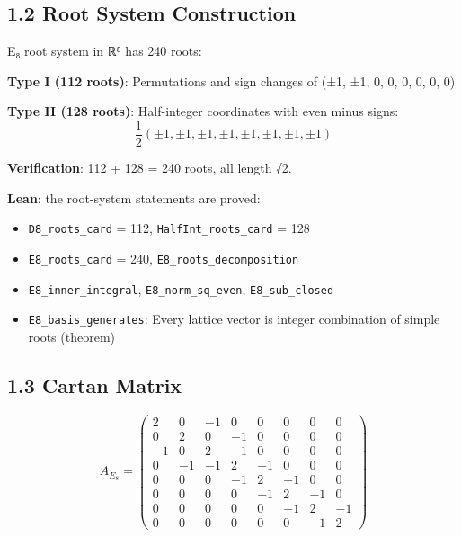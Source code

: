 \documentclass[11pt,a4paper]{article}
\begin{document}
\subsection{1.2 Root System Construction}\label{root-system-construction}

E₈ root system in ℝ⁸ has 240 roots:

\textbf{Type I (112 roots)}: Permutations and sign changes of (±1, ±1, 0, 0, 0, 0, 0, 0)

\textbf{Type II (128 roots)}: Half-integer coordinates with even minus signs: \[\frac{1}{2}(\pm 1, \pm 1, \pm 1, \pm 1, \pm 1, \pm 1, \pm 1, \pm 1)\]

\textbf{Verification}: 112 + 128 = 240 roots, all length √2.

\textbf{Lean}: the root-system statements are proved:

\begin{itemize}
\tightlist
\item
  \texttt{D8\_\allowbreak{}roots\_\allowbreak{}card} = 112, \texttt{Half\allowbreak{}Int\_\allowbreak{}roots\_\allowbreak{}card} = 128
\item
  \texttt{E8\_\allowbreak{}roots\_\allowbreak{}card} = 240, \texttt{E8\_\allowbreak{}roots\_\allowbreak{}decomposition}
\item
  \texttt{E8\_\allowbreak{}inner\_\allowbreak{}integral}, \texttt{E8\_\allowbreak{}norm\_\allowbreak{}sq\_\allowbreak{}even}, \texttt{E8\_\allowbreak{}sub\_\allowbreak{}closed}
\item
  \texttt{E8\_\allowbreak{}basis\_\allowbreak{}generates}: Every lattice vector is integer combination of simple roots (theorem)
\end{itemize}

\subsection{1.3 Cartan Matrix}\label{cartan-matrix}

\[A_{E_8} = \begin{pmatrix}
2 & 0 & -1 & 0 & 0 & 0 & 0 & 0 \\
0 & 2 & 0 & -1 & 0 & 0 & 0 & 0 \\
-1 & 0 & 2 & -1 & 0 & 0 & 0 & 0 \\
0 & -1 & -1 & 2 & -1 & 0 & 0 & 0 \\
0 & 0 & 0 & -1 & 2 & -1 & 0 & 0 \\
0 & 0 & 0 & 0 & -1 & 2 & -1 & 0 \\
0 & 0 & 0 & 0 & 0 & -1 & 2 & -1 \\
0 & 0 & 0 & 0 & 0 & 0 & -1 & 2
\end{pmatrix}\]
\end{document}
